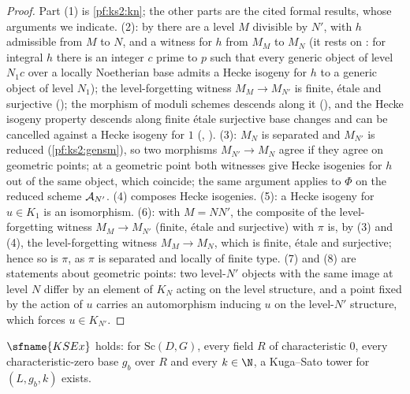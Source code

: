 \begin{proof}
Part (1) is \cref{pf:ks2:kn}; the other parts are the cited formal results, whose arguments we
indicate. (2): by  there are a level $M$ divisible by
$N'$, with $h$ admissible from $M$ to $N$, and a witness for $h$ from $M_M$ to $M_N$ (it rests on
: for integral $h$ there is an integer $c$ prime to
$p$ such that every generic object of level $N_1c$ over a locally Noetherian base admits a Hecke
isogeny for $h$ to a generic object of level $N_1$); the level-forgetting witness $M_M\to M_{N'}$ is
finite, \'etale and surjective (); the morphism of
moduli schemes descends along it (), and the Hecke
isogeny property descends along finite \'etale surjective base changes and can be cancelled against
a Hecke isogeny for $1$ (,
). (3): $M_N$ is separated and $M_{N'}$ is reduced
(\cref{pf:ks2:gensm}), so two morphisms $M_{N'}\to M_N$ agree if they agree on geometric points; at a
geometric point both witnesses give Hecke isogenies for $h$ out of the same object, which coincide;
the same argument applies to $\Phi$ on the reduced scheme $\mathcal{A}_{N'}$. (4) composes Hecke
isogenies. (5): a Hecke isogeny for $u\in K_1$ is an isomorphism. (6): with $M=NN'$, the composite
of the level-forgetting witness $M_M\to M_{N'}$ (finite, \'etale and surjective) with $\pi$ is, by (3)
and (4), the level-forgetting witness $M_M\to M_N$, which is finite, \'etale and surjective; hence so
is $\pi$, as $\pi$ is separated and locally of finite type. (7) and (8) are statements about
geometric points: two level-$N'$ objects with the same image at level $N$ differ by an element of
$K_N$ acting on the level structure, and a point fixed by the action of $u$ carries an automorphism
inducing $u$ on the level-$N'$ structure, which forces $u\in K_{N'}$.\end{proof}

\begin{proposition}\label{pf:ks2:ksex}
$\sfname{KSEx}$ holds: for $\mathrm{Sc}(D,G)$, every field $R$ of characteristic $0$, every
characteristic-zero base $g_b$ over $R$ and every $k\in\N$, a Kuga--Sato tower for
$(L,g_b,k)$ exists.
\end{proposition}

